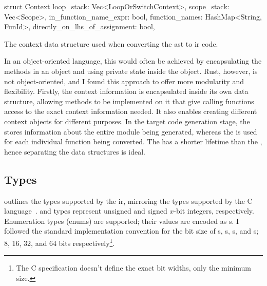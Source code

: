 \documentclass[00-main.tex]{subfiles}
\begin{document}
\begin{listing}[t]
  \begin{RustListing}
    struct Context {
        loop_stack: Vec<LoopOrSwitchContext>,
        scope_stack: Vec<Scope>,
        in_function_name_expr: bool,
        function_names: HashMap<String, FunId>,
        directly_on_lhs_of_assignment: bool,
    }
  \end{RustListing}
  \caption{The context data structure used when converting the \gls{ast} to \gls{ir} code.}
  \label{lst:AST to IR context struct}
\end{listing}

In an object-oriented language, this would often be achieved by encapsulating the methods in an object and using private state inside the object.
Rust, however, is not object-oriented, and I found this approach to offer more modularity and flexibility.
Firstly, the context information is encapsulated inside its own data structure, allowing methods to be implemented on it that give calling functions access to the exact context information needed.
It also enables creating different context objects for different purposes.
In the target code generation stage, the  stores information about the entire module being generated, whereas the  is used for each individual function being converted.
The  has a shorter lifetime than the , hence separating the data structures is ideal.


\subsection{Types}

 outlines the types supported by the \gls{ir}, mirroring the types supported by the C language~.
 and  types represent unsigned and signed $x$-bit integers, respectively.
Enumeration types (enums) are supported; their values are encoded as s.
I followed the standard implementation convention for the bit size of s, s, s, and s; 8, 16, 32, and 64 bits respectively\footnote{The C specification doesn't define the exact bit widths, only the minimum size.}.
\end{document}
